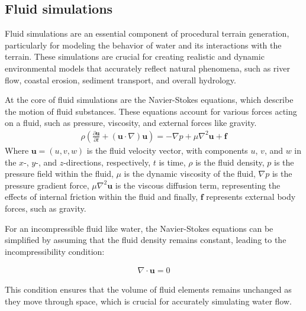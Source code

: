 \subsection{Fluid simulations}
Fluid simulations are an essential component of procedural terrain generation, particularly for modeling the behavior of water and its interactions with the terrain. These simulations are crucial for creating realistic and dynamic environmental models that accurately reflect natural phenomena, such as river flow, coastal erosion, sediment transport, and overall hydrology.

At the core of fluid simulations are the Navier-Stokes equations, which describe the motion of fluid substances. These equations account for various forces acting on a fluid, such as pressure, viscosity, and external forces like gravity. 
\begin{align}
    \rho \left( \frac{\partial \mathbf{u}}{\partial t} + (\mathbf{u} \cdot \nabla) \mathbf{u} \right) = -\nabla p + \mu \nabla^2 \mathbf{u} + \mathbf{f}
\end{align}
Where $\mathbf{u} = (u, v, w)$ is the fluid velocity vector, with components $u$, $v$, and $w$ in the $x$-, $y$-, and $z$-directions, respectively, $t$ is time, $\rho$ is the fluid density, $p$ is the pressure field within the fluid, $\mu$ is the dynamic viscosity of the fluid, $\nabla p$ is the pressure gradient force, $\mu \nabla^2 \mathbf{u}$ is the viscous diffusion term, representing the effects of internal friction within the fluid and finally, $\mathbf{f}$ represents external body forces, such as gravity.

For an incompressible fluid like water, the Navier-Stokes equations can be simplified by assuming that the fluid density remains constant, leading to the incompressibility condition:

\begin{align}
    \nabla \cdot \mathbf{u} = 0
\end{align}

This condition ensures that the volume of fluid elements remains unchanged as they move through space, which is crucial for accurately simulating water flow.

